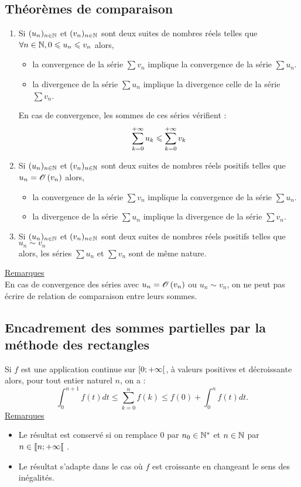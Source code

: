 \subsection{Théorèmes de comparaison}
\begin{theo}
    \begin{enumerate}
    \item Si \((u_n)_{n\in \mathbb{N} }\) et \((v_n)_{n\in \mathbb{N}}\) sont deux suites de nombres réels telles que \(\forall n \in  \mathbb{N}, 0 \leqslant u_n \leqslant v_n\) alors,
    \begin{itemize}
        \item la convergence de la série \(\sum v_n\) implique la convergence de la série \(\sum u_n \).
        \item la divergence de la série \(\sum u_n \) implique la divergence celle de la série \(\sum v_n\).
    \end{itemize}
    En cas de convergence, les sommes de ces séries vérifient :
    \[\sum^{+\infty}_{k=0}u_k \leqslant \sum^{+\infty}_{k=0} v_k\]
    \item Si \((u_n)_{n\in \mathbb{N} }\) et \((v_n)_{n\in \mathbb{N}}\) sont deux suites de nombres réels positifs telles que \(u_n = \mathscr{O}\left(v_n\right)\) alors,
    \begin{itemize}
        \item la convergence de la série \(\sum v_n\) implique la convergence de la série \(\sum u_n\).
        \item la divergence de la série \(\sum u_n \) implique la divergence de la série \(\sum v_n\).
    \end{itemize}
    \item Si \((u_n)_{n\in \mathbb{N} }\) et \((v_n)_{n\in \mathbb{N}}\) sont deux suites de nombres réels positifs telles que \(u_n \sim v_n\)\\
    alors, les séries \(\sum u_n\) et \(\sum v_n\) sont de même nature.
    \end{enumerate}
    \underline{Remarques}\\
    En cas de convergence des séries avec \(u_n = \mathscr{O}\left(v_n\right)\) ou \(u_n \sim v_n\), on ne peut pas écrire de relation de comparaison entre leurs sommes.
\end{theo}
\subsection{Encadrement des sommes partielles par la méthode des rectangles}
\begin{defprop}
    Si \(f\) est une application continue sur \(\left[0;+\infty\right[\), à valeurs positives et décroissante alors, pour tout entier naturel \(n\), on a : 
    \[\int^{n+1}_{0}f (t)dt \leq \sum^{n}_{k=0} f (k) \leq f (0) + \int^n_0 f (t)dt.\]
    \underline{Remarques}\\
    \begin{itemize}
        \item Le résultat est conservé si on remplace \(0\) par \(n_0 \in  \mathbb{N}^*\) et \(n \in  \mathbb{N}\) par \(n \in  \left\llbracket n;+\infty\right\llbracket\) .
        \item Le résultat s’adapte dans le cas où \(f\) est croissante en changeant le sens des inégalités.
    \end{itemize}
\end{defprop}
